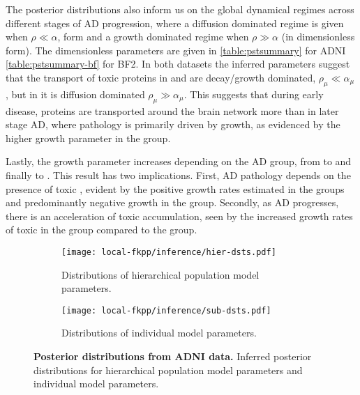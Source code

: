 The posterior distributions also inform us on the global dynamical regimes
across different stages of AD progression, where a diffusion dominated regime is
given when $ \rho \ll \alpha $, form and a growth dominated regime when $ \rho
\gg \alpha$ (in dimensionless form). The dimensionless parameters are given in
\cref{table:pstsummary} for ADNI \cref{table:pstsummary-bf} for BF2.
In both datasets the inferred parameters suggest that the transport of toxic
proteins in \ABN and \ABP \TPP are decay/growth dominated, $ \rho_\mu \ll
\alpha_\mu $, but in \ABP \TPP it is diffusion dominated $ \rho_\mu \gg
\alpha_\mu $. This suggests that during early disease, proteins are transported
around the brain network more than in later stage AD, where pathology is
primarily driven by growth, as evidenced by the higher growth parameter in the
\ABP \TPP group.

Lastly, the growth parameter increases depending on the AD group, from \ABN to
\ABP \TPN and finally to \ABP \TPP. This result has two implications. First, AD
pathology depends on the presence of toxic \AB, evident by the positive growth
rates estimated in the \ABP groups and predominantly negative growth in the \ABN
group. Secondly, as AD progresses, there is an acceleration of toxic \TP
accumulation, seen by the increased growth rates of toxic \TP in the \ABP \TPP
group compared to the \ABP \TPN group.

\begin{figure}[H]
    \centering
    \begin{subfigure}{0.8\textwidth}
        \centering
        \texttt{[image: local-fkpp/inference/hier-dsts.pdf]}
        \caption{Distributions of hierarchical population model parameters.}
        \label{fig:hier-dsts}
    \end{subfigure}

    \begin{subfigure}{0.8\textwidth}
        \centering
        \texttt{[image: local-fkpp/inference/sub-dsts.pdf]}
        \caption{Distributions of individual model parameters.}
        \label{fig:sub-dsts}
    \end{subfigure}
    
    \caption{\textbf{Posterior distributions from ADNI data.} 
    Inferred posterior distributions for hierarchical population model
    parameters and individual model parameters.}
    \label{fig:inferred-dsts}
\end{figure}

